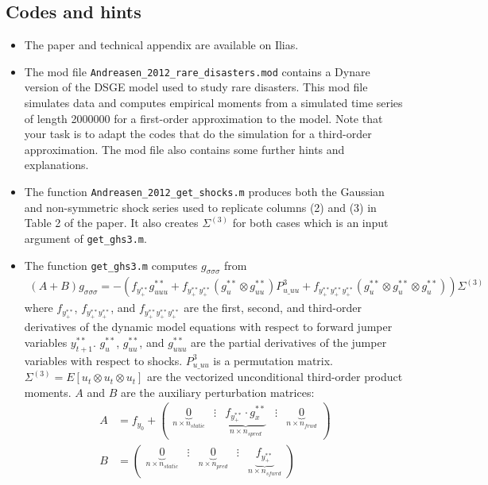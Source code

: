 \documentclass{article}
\begin{document}
\subsection*{Codes and hints}
\begin{itemize}
\item The paper and technical appendix are available on Ilias.
\item The mod file \texttt{Andreasen\_2012\_rare\_disasters.mod} contains a Dynare version of the DSGE model used to study rare disasters.
This mod file simulates data and computes empirical moments from a simulated time series of length 2000000 for a first-order approximation to the model.
Note that your task is to adapt the codes that do the simulation for a third-order approximation.
The mod file also contains some further hints and explanations.
\item The function \texttt{Andreasen\_2012\_get\_shocks.m} produces both the Gaussian and non-symmetric shock series used to replicate columns (2) and (3) in Table 2 of the paper.
It also creates $\Sigma^{(3)}$ for both cases which is an input argument of \texttt{get\_ghs3.m}.
\item The function \texttt{get\_ghs3.m} computes $g_{\sigma\sigma\sigma}$ from
\begin{align*}
(A+B) g_{\sigma\sigma\sigma} = -\left( f_{y^{**}_{+}} g^{**}_{uuu} + f_{y^{**}_{+}y^{**}_{+}} (g^{**}_u \otimes g^{**}_{uu})P^3_{u\_uu} + f_{y^{**}_{+}y^{**}_{+}y^{**}_{+}} (g^{**}_u \otimes g^{**}_u \otimes g^{**}_u)\right)\Sigma^{(3)} \label{eq:gsss}
\end{align*}
where $f_{y^{**}_{+}}$, $f_{y^{**}_{+}y^{**}_{+}}$, and $f_{y^{**}_{+}y^{**}_{+}y^{**}_{+}}$ are the first, second, and third-order derivatives of the dynamic model equations with respect to forward jumper variables $y_{t+1}^{**}$.
$g^{**}_u$, $g^{**}_{uu}$, and $g^{**}_{uuu}$ are the partial derivatives of the jumper variables with respect to shocks.
$P^3_{u\_uu}$ is a permutation matrix.
$\Sigma^{(3)} = E[u_t \otimes u_t \otimes u_t]$ are the vectorized unconditional third-order product moments.
$A$ and $B$ are the auxiliary perturbation matrices:
\begin{align*}
	A & = f_{y_0} + \begin{pmatrix} \underbrace{0}_{n\times n_{static}} &\vdots& \underbrace{f_{y^{**}_{+}} \cdot g^{**}_{x}}_{n \times n_{spred}} &\vdots& \underbrace{0}_{n\times n_{frwd}}  \end{pmatrix}\\
	B & = \begin{pmatrix} \underbrace{0}_{n \times n_{static}}&\vdots & \underbrace{0}_{n \times n_{pred}} & \vdots & \underbrace{f_{y^{**}_{+}}}_{n \times n_{sfwrd}} \end{pmatrix}

\end{align*}
\end{itemize}
\end{document}
